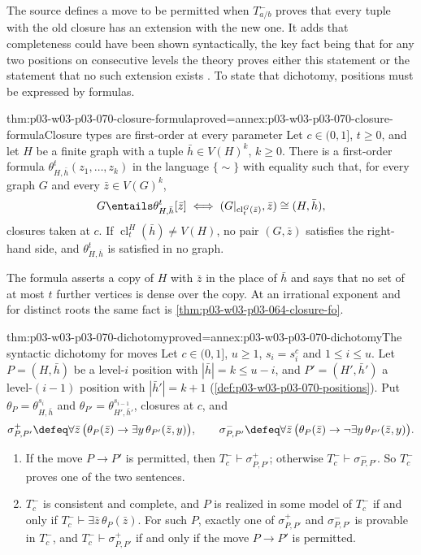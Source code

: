 The source defines a move to be permitted when \(T^-_{a/b}\) proves that
every tuple with the old closure has an extension with the new one.  It adds
that completeness could have been shown syntactically, the key fact being
that for any two positions on consecutive levels the theory proves either
this statement or the statement that no such extension exists
\cite[pp.~20--21]{Spencer2007LogicRandomStructuresAuthor}.  To state that
dichotomy, positions must be expressed by formulas.

\begin{hblemma}{thm:p03-w03-p03-070-closure-formula}{proved=annex:p03-w03-p03-070-closure-formula}{Closure types are first-order at every parameter}
Let \(c\in(0,1]\), \(t\geq0\), and let \(H\) be a finite graph with a tuple
\(\bar h\in V(H)^k\), \(k\geq0\).  There is a first-order formula
\(\theta^t_{H,\bar h}(z_1,\ldots,z_k)\) in the language \(\{\sim\}\) with
equality such that, for every graph \(G\) and every \(\bar z\in V(G)^k\),
\[
  G\entails\theta^t_{H,\bar h}[\bar z]\iff
  (G|_{\operatorname{cl}^G_t(\bar z)},\bar z)\cong(H,\bar h),
\]
closures taken at \(c\).  If \(\operatorname{cl}^H_t(\bar h)\neq V(H)\), no
pair \((G,\bar z)\) satisfies the right-hand side, and
\(\theta^t_{H,\bar h}\) is satisfied in no graph.
\end{hblemma}

The formula asserts a copy of \(H\) with \(\bar z\) in the place of \(\bar h\)
and says that no set of at most \(t\) further vertices is dense over the
copy.  At an irrational exponent and for distinct roots the same fact is
\cref{thm:p03-w03-p03-064-closure-fo}.

\begin{hbtheorem}{thm:p03-w03-p03-070-dichotomy}{proved=annex:p03-w03-p03-070-dichotomy}{The syntactic dichotomy for moves}
Let \(c\in(0,1]\), \(u\geq1\), \(s_i=s^c_i\) and \(1\leq i\leq u\).  Let
\(P=(H,\bar h)\) be a level-\(i\) position with \(|\bar h|=k\leq u-i\), and
\(P'=(H',\bar h')\) a level-\((i-1)\) position with \(|\bar h'|=k+1\)
(\cref{def:p03-w03-p03-070-positions}).  Put
\(\theta_P=\theta^{s_i}_{H,\bar h}\) and
\(\theta_{P'}=\theta^{s_{i-1}}_{H',\bar h'}\), closures at \(c\), and
\[
  \sigma^+_{P,P'}\defeq\forall\bar z\,\bigl(\theta_P(\bar z)\to
  \exists y\,\theta_{P'}(\bar z,y)\bigr),\qquad
  \sigma^-_{P,P'}\defeq\forall\bar z\,\bigl(\theta_P(\bar z)\to
  \neg\exists y\,\theta_{P'}(\bar z,y)\bigr).
\]
\begin{enumerate}
\item If the move \(P\to P'\) is permitted, then
      \(T^-_c\vdash\sigma^+_{P,P'}\); otherwise \(T^-_c\vdash\sigma^-_{P,P'}\).
      So \(T^-_c\) proves one of the two sentences.
\item \(T^-_c\) is consistent and complete, and \(P\) is realized in some
      model of \(T^-_c\) if and only if \(T^-_c\vdash\exists\bar z\,\theta_P(\bar z)\).
      For such \(P\), exactly one of \(\sigma^+_{P,P'}\) and
      \(\sigma^-_{P,P'}\) is provable in \(T^-_c\), and
      \(T^-_c\vdash\sigma^+_{P,P'}\) if and only if the move \(P\to P'\) is
      permitted.
\end{enumerate}
\end{hbtheorem}

